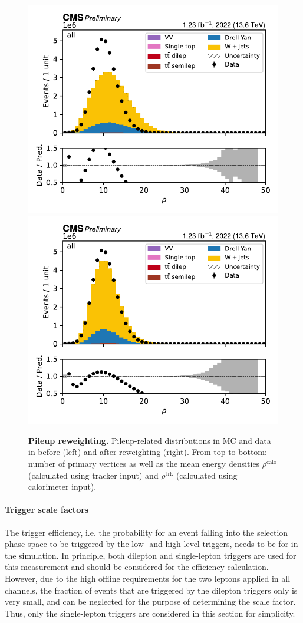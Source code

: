 \begin{figure}[p]
    \includegraphics[width=0.49 \textwidth]{figures/ttxs/pileup/rhoFastjetCentralCalo_orig.pdf}
    \hfill
    \includegraphics[width=0.49 \textwidth]{figures/ttxs/pileup/rhoFastjetCentralCalo_reweighted.pdf}
    \caption{\textbf{Pileup reweighting.} Pileup-related distributions in MC and data in before (left) and after reweighting (right). From top to bottom: number of primary vertices as well as the mean energy densities $\rho^{\mathrm{calo}}$ (calculated using tracker input) and $\rho^{\mathrm{trk}}$ (calculated using calorimeter input). }
    \label{fig:ttxs:pileup}
  \end{figure}

\paragraph{Trigger scale factors}

The trigger efficiency, i.e. the probability for an event falling into the selection phase space to be triggered by the low- and high-level triggers, needs to be for in the simulation.
In principle, both dilepton and single-lepton triggers are used for this measurement and should be considered for the efficiency calculation. However, due to the high offline \pt requirements for the two leptons applied in all channels, the fraction of events that are triggered by the dilepton triggers only is very small, and can be neglected for the purpose of determining the scale factor. Thus, only the single-lepton triggers are considered in this section for simplicity.

